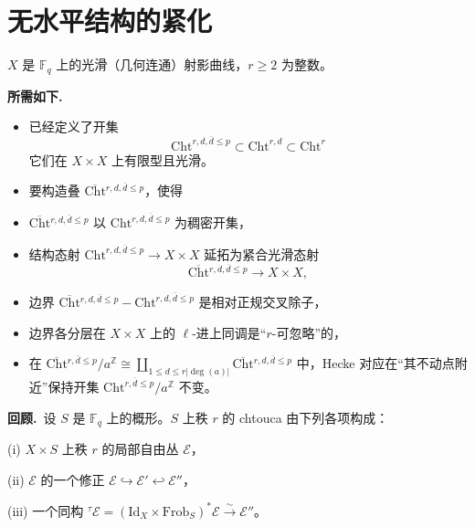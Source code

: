
\section{无水平结构的紧化}

$X$ 是 $\mathbb{F}_q$ 上的光滑（几何连通）射影曲线，$r\ge 2$ 为整数。

\par\medskip\noindent\textbf{所需如下.}\ 
\begin{itemize}
\item 已经定义了开集
\[
\mathrm{Cht}^{r,d,\overline{d}\le p}\subset\mathrm{Cht}^{r,d}\subset\mathrm{Cht}^{r}
\]
它们在 $X\times X$ 上有限型且光滑。
\item 要构造叠 $\overline{\mathrm{Cht}}{}^{r,d,\overline{d}\le p}$，使得
\item \origpage{20}$\overline{\mathrm{Cht}}{}^{r,d,\overline{d}\le p}$ 以 $\mathrm{Cht}^{r,d,\overline{d}\le p}$ 为稠密开集，
\item 结构态射 $\mathrm{Cht}^{r,d,\overline{d}\le p}\to X\times X$ 延拓为紧合光滑态射
\[
\overline{\mathrm{Cht}}{}^{r,d,\overline{d}\le p}\to X\times X,
\]
\item 边界 $\overline{\mathrm{Cht}}{}^{r,d,\overline{d}\le p}-\mathrm{Cht}^{r,d,\overline{d}\le p}$ 是相对正规交叉除子，
\item 边界各分层在 $X\times X$ 上的 $\ell$-进上同调是“$r$-可忽略”的，
\item 在 $\overline{\mathrm{Cht}}{}^{r,\overline{d}\le p}/a^{\mathbb{Z}}\cong\coprod_{1\le d\le r|\deg(a)|}\overline{\mathrm{Cht}}{}^{r,d,\overline{d}\le p}$ 中，Hecke 对应在“其不动点附近”保持开集 $\mathrm{Cht}^{r,\overline{d}\le p}/a^{\mathbb{Z}}$ 不变。
\end{itemize}

\par\medskip\noindent\textbf{回顾.}\ 设 $S$ 是 $\mathbb{F}_q$ 上的概形。$S$ 上秩 $r$ 的 chtouca 由下列各项构成：

(i) $X\times S$ 上秩 $r$ 的局部自由丛 $\mathcal{E}$，

(ii) $\mathcal{E}$ 的一个修正 $\mathcal{E}\hookrightarrow\mathcal{E}'\hookleftarrow\mathcal{E}''$，

(iii) 一个同构 ${}^\tau\mathcal{E}=(\mathrm{Id}_X\times\mathrm{Frob}_S)^*\mathcal{E}\xrightarrow{\sim}\mathcal{E}''$。

